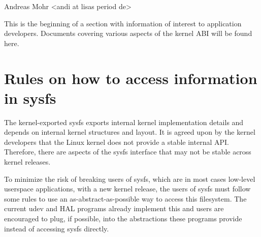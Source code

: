 \documentclass[a4paper,8pt,english]{sphinxmanual}
\begin{document}
Andreas Mohr \textless{}andi at lisas period de\textgreater{}

This is the beginning of a section with information of interest to
application developers.  Documents covering various aspects of the kernel
ABI will be found here.


\chapter{Rules on how to access information in sysfs}
\label{admin-guide/sysfs-rules::doc}\label{admin-guide/sysfs-rules:rules-on-how-to-access-information-in-sysfs}
The kernel-exported sysfs exports internal kernel implementation details
and depends on internal kernel structures and layout. It is agreed upon
by the kernel developers that the Linux kernel does not provide a stable
internal API. Therefore, there are aspects of the sysfs interface that
may not be stable across kernel releases.

To minimize the risk of breaking users of sysfs, which are in most cases
low-level userspace applications, with a new kernel release, the users
of sysfs must follow some rules to use an as-abstract-as-possible way to
access this filesystem. The current udev and HAL programs already
implement this and users are encouraged to plug, if possible, into the
abstractions these programs provide instead of accessing sysfs directly.
\end{document}
